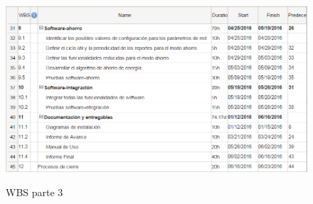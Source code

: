 \begin{figure}[h!]
	\centering
    \includegraphics[width=1\textwidth]{./Figures/WBS3.PNG}
	\label{fig:WBS3}
	\caption{WBS parte 3}
\end{figure}

